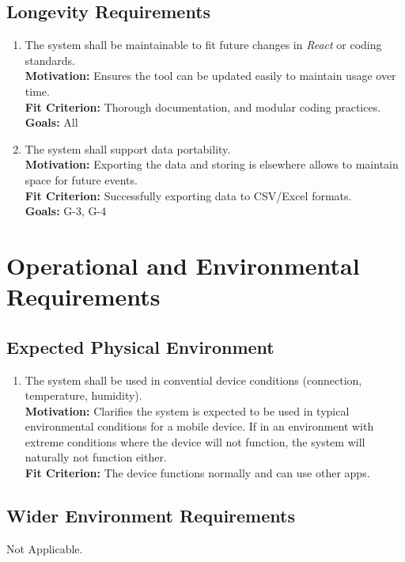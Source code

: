 \documentclass[12pt]{article}
\begin{document}
\subsection{Longevity Requirements}
\begin{enumerate}[label=\bfseries LG-\arabic*:, wide=0pt, leftmargin=*, ref=\bfseries LG-\arabic*]
  \item \label{LG1} The system shall be maintainable to fit future changes in \textit{React} or coding standards.\\
    {\bf Motivation:} Ensures the tool can be updated easily to maintain usage over time.\\
    {\bf Fit Criterion:} Thorough documentation, and modular coding practices.\\
    {\bf Goals:} All
  \item \label{LG2} The system shall support data portability.\\
    {\bf Motivation:} Exporting the data and storing is elsewhere allows to maintain space for future events.\\
    {\bf Fit Criterion:} Successfully exporting data to CSV/Excel formats.\\
    {\bf Goals:} G-3, G-4
\end{enumerate}

\section{Operational and Environmental Requirements}
\subsection{Expected Physical Environment}
\begin{enumerate}[label=\bfseries PE-\arabic*:, wide=0pt, leftmargin=*]
  \item The system shall be used in convential device conditions (connection, temperature, humidity).\\
    {\bf Motivation:} Clarifies the system is expected to be used in typical environmental conditions for a mobile device. If in an environment with extreme conditions where the device will not function, the system will naturally not function either.\\
    {\bf Fit Criterion:} The device functions normally and can use other apps.\\
\end{enumerate}

\subsection{Wider Environment Requirements}
Not Applicable.
\end{document}
